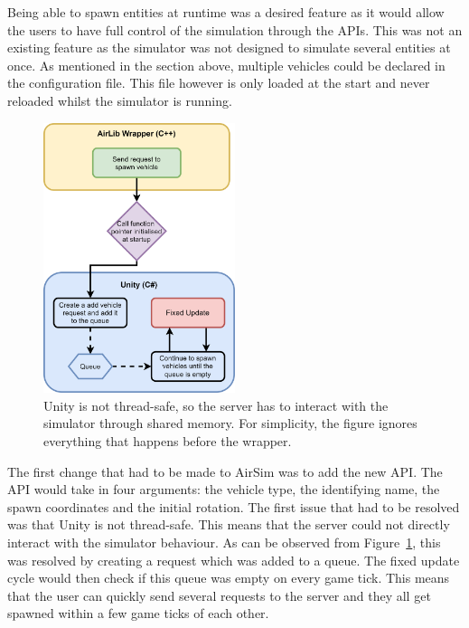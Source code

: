 

Being able to spawn entities at runtime was a desired feature as it would allow the users to have full control of the simulation through the APIs. This was not an existing feature as the simulator was not designed to simulate several entities at once. As mentioned in the section above, multiple vehicles could be declared in the configuration file. This file however is only loaded at the start and never reloaded whilst the simulator is running. 

\begin{figure}
    \includegraphics[width=0.5\textwidth]{06_Implementation/00_AirSim/Diagrams/spawnVehicle.png}
    \caption{Unity is not thread-safe, so the server has to interact with the simulator through shared memory. For simplicity, the figure ignores everything that happens before the wrapper.} \label{06:spawnVehicle}
\end{figure}

The first change that had to be made to AirSim was to add the new API. The API would take in four arguments: the vehicle type, the identifying name, the spawn coordinates and the initial rotation. The first issue that had to be resolved was that Unity is not thread-safe. This means that the server could not directly interact with the simulator behaviour. As can be observed from Figure~\ref{06:spawnVehicle}, this was resolved by creating a request which was added to a queue. The fixed update cycle would then check if this queue was empty on every game tick. This means that the user can quickly send several requests to the server and they all get spawned within a few game ticks of each other. 

